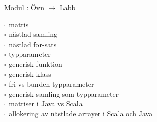 
    Modul : Övn  $\rightarrow$ Labb 
    \begin{multicols}{3}\SlideFontTiny
    $\square$ matris \\
$\square$ nästlad samling \\
$\square$ nästlad for-sats \\
$\square$ typparameter \\
$\square$ generisk funktion \\
$\square$ generisk klass \\
$\square$ fri vs bunden typparameter \\
$\square$ generisk samling som typparameter \\
$\square$ matriser i Java vs Scala \\
$\square$ allokering av nästlade arrayer i Scala och Java \\
    \end{multicols}
    